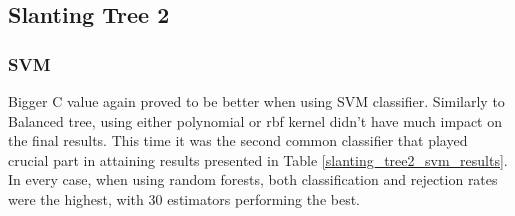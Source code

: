 \subsection{Slanting Tree 2}

\subsubsection{SVM}

Bigger C value again proved to be better when using SVM classifier. Similarly to Balanced tree, using either polynomial or rbf kernel didn't have much impact on the final results. This time it was the second common classifier that played crucial part in attaining results presented in Table \ref{slanting_tree2_svm_results}. In every case, when using random forests, both classification and rejection rates were the highest, with 30 estimators performing the best.

